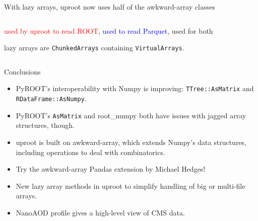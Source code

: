 \documentclass[aspectratio=169]{beamer}
\begin{document}
\begin{frame}{With lazy arrays, uproot now uses half of the awkward-array classes}
\begin{columns}
\vspace{-0.25 cm}
\begin{center}
\begin{minipage}{0.63\linewidth}
\small
\textcolor{red}{used by uproot to read ROOT}, \textcolor{blue}{used to read Parquet}, \textcolor{mauve}{used for both}

lazy arrays are \texttt{ChunkedArrays} containing \texttt{VirtualArrays}.
\end{minipage}
\end{center}
\end{columns}
\end{frame}

\begin{frame}{Conclusions}
\Large
\vspace{0.25 cm}

\begin{itemize}\setlength{\itemsep}{0.2 cm}
\item PyROOT's interoperability with Numpy is improving: \texttt{TTree::AsMatrix} and \texttt{RDataFrame::AsNumpy}.
\item PyROOT's \texttt{AsMatrix} and root\_numpy both have issues with jagged array structures, though.
\item uproot is built on awkward-array, which extends Numpy's data structures, including operations to deal with combinatorics.
\item Try the awkward-array Pandas extension by Michael Hedges!
\item New lazy array methods in uproot to simplify handling of big or multi-file arrays.
\item NanoAOD profile gives a high-level view of CMS data.
\end{itemize}
\end{frame}
\end{document}
